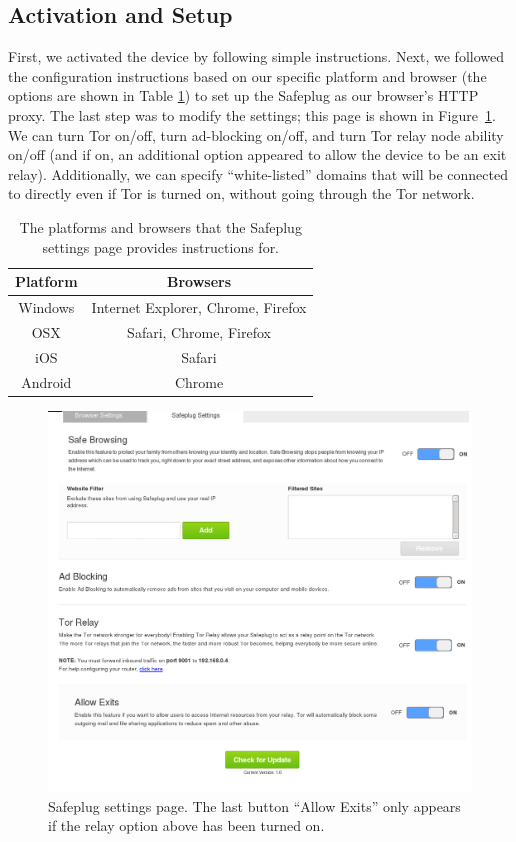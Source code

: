 \documentclass[letterpaper,twocolumn,10pt]{article}
\begin{document}
\subsection{Activation and Setup}

First, we activated the device by following simple instructions.  Next, we followed the configuration instructions based on our specific platform and browser (the options are shown in Table \ref{table_example}) to set up the Safeplug as our browser's HTTP proxy.  The last step was to modify the settings; this page is shown in Figure~\ref{fig:settings}.  We can turn Tor on/off, turn ad-blocking on/off, and turn Tor relay node ability on/off (and if on, an additional option appeared to allow the device to be an exit relay).  Additionally, we can specify ``white-listed'' domains that will be connected to directly even if Tor is turned on, without going through the Tor network.

\begin{table}[!t]
\renewcommand{\arraystretch}{1.3}
\centering
\small
	\begin{tabular}{|c|c|}
	\hline
		Platform & Browsers \\ \hline
		Windows	& Internet Explorer, Chrome, Firefox \\ \hline
		OSX & Safari, Chrome, Firefox \\ \hline
		iOS	& Safari \\ \hline
		Android	& Chrome \\ \hline
	\end{tabular}
\caption{The platforms and browsers that the Safeplug settings page provides instructions for.}
\label{table_example}
\end{table}



\begin{figure}
  \centering
  \includegraphics[width=.5\textwidth]{settings_with_exit}
  \caption{Safeplug settings page.  The last button ``Allow Exits'' only appears if the relay option above has been turned on.}
  \label{fig:settings}
\end{figure}
\end{document}
